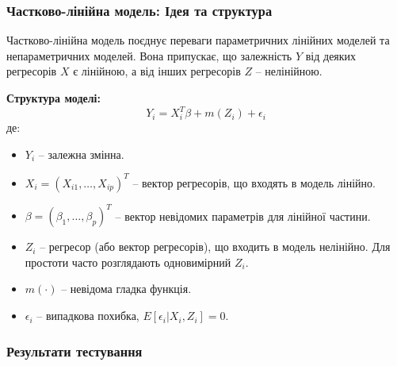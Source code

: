 ﻿\documentclass{beamer}
\begin{document}
\begin{frame}
  \frametitle{Частково-лінійна модель: Ідея та структура}
  Частково-лінійна модель поєднує переваги параметричних лінійних моделей та непараметричних моделей.
  Вона припускає, що залежність $Y$ від деяких регресорів $X$ є лінійною, а від інших регресорів $Z$ – нелінійною.

  \textbf{Структура моделі:}
  $$ Y_i = X_i^T \beta + m(Z_i) + \epsilon_i $$
  де:
  \begin{itemize}
    \item $Y_i$ – залежна змінна.
    \item $X_i = (X_{i1}, \dots, X_{ip})^T$ – вектор регресорів, що входять в модель лінійно.
    \item $\beta = (\beta_1, \dots, \beta_p)^T$ – вектор невідомих параметрів для лінійної частини.
    \item $Z_i$ – регресор (або вектор регресорів), що входить в модель нелінійно. Для простоти часто розглядають одновимірний $Z_i$.
    \item $m(\cdot)$ – невідома гладка функція.
    \item $\epsilon_i$ – випадкова похибка, $E[\epsilon_i|X_i, Z_i] = 0$.
  \end{itemize}
\end{frame}


\begin{frame}
  \frametitle{Результати тестування}


\end{frame}
\end{document}
